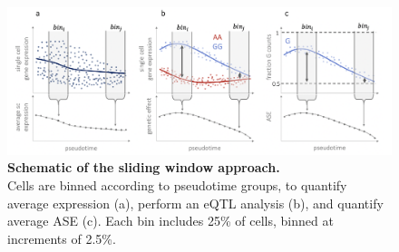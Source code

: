\begin{figure}[h]
\centering
\includegraphics[width=15.5cm]{Chapter4/Fig/endodiff_running_average.png}
\caption[Schematic of the sliding window approach]{\textbf{Schematic of the sliding window approach.}\\
Cells are binned according to pseudotime groups, to quantify average expression (a), perform an eQTL analysis (b), and quantify average ASE (c).
Each bin includes 25\% of cells, binned at increments of 2.5\%.}
\label{fig:endodiff_sliding_window}
\end{figure}

